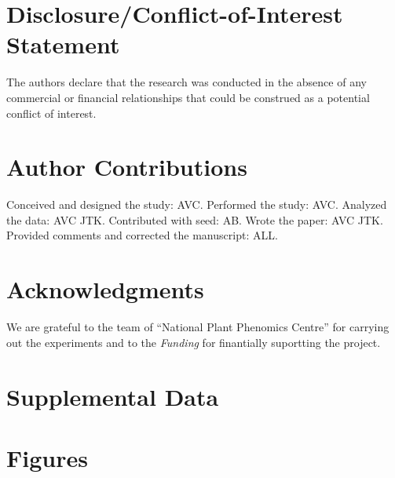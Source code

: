 \documentclass{frontiersSCNS} %
\begin{document}
\section*{Disclosure/Conflict-of-Interest Statement}


The authors declare that the research was conducted in the absence of any commercial or financial relationships that could be construed as a potential conflict of interest.

\section*{Author Contributions}

Conceived and designed the study: AVC. Performed the study: AVC. Analyzed the data: AVC JTK. Contributed with seed: AB. Wrote the paper: AVC JTK. Provided comments and corrected the manuscript: ALL.

\section*{Acknowledgments}
 We are grateful to the team of “National Plant Phenomics Centre” for carrying out the experiments and to the 
\textit{Funding\textcolon} for finantially suportting the project.

\section*{Supplemental Data}





\section*{Figures}

\end{document}
